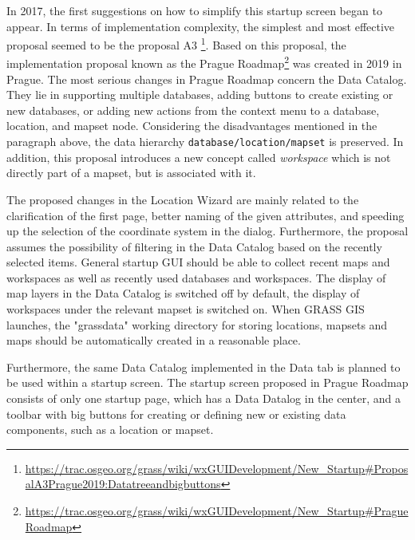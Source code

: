 \documentclass[a4paper,10pt,twoside]{article}
\begin{document}
In 2017, the first suggestions on how to simplify this startup screen
began to appear. In terms of implementation complexity, the simplest
and most effective proposal seemed to be the proposal A3
\footnote{\url{https://trac.osgeo.org/grass/wiki/wxGUIDevelopment/New\_Startup\#ProposalA3Prague2019:Datatreeandbigbuttons}}. Based
on this proposal, the implementation proposal known as the Prague
Roadmap\footnote{\url{https://trac.osgeo.org/grass/wiki/wxGUIDevelopment/New\_Startup\#PragueRoadmap}}
was created in 2019 in Prague.  The most serious changes in Prague
Roadmap concern the Data Catalog. They lie in supporting multiple
databases, adding buttons to create existing or new databases, or
adding new actions from the context menu to a database, location, and
mapset node. Considering the disadvantages mentioned in the paragraph
above, the data hierarchy \texttt{database/location/mapset} is
preserved. In addition, this proposal introduces a new concept called
\textit{workspace} which is not directly part of a mapset, but is
associated with it.

The proposed changes in the Location Wizard are mainly related to the
clarification of the first page, better naming of the given
attributes, and speeding up the selection of the coordinate system in
the dialog. Furthermore, the proposal assumes the possibility of
filtering in the Data Catalog based on the recently selected
items. General startup GUI should be able to collect recent maps and
workspaces as well as recently used databases and workspaces. The
display of map layers in the Data Catalog is switched off by default,
the display of workspaces under the relevant mapset is switched
on. When GRASS GIS launches, the "grassdata" working directory for
storing locations, mapsets and maps should be automatically created in
a reasonable place.

Furthermore, the same Data Catalog implemented in the Data tab is
planned to be used within a startup screen. The startup screen
proposed in Prague Roadmap consists of only one startup page, which
has a Data Datalog in the center, and a toolbar with big buttons for
creating or defining new or existing data components, such as a
location or mapset.
\end{document}
